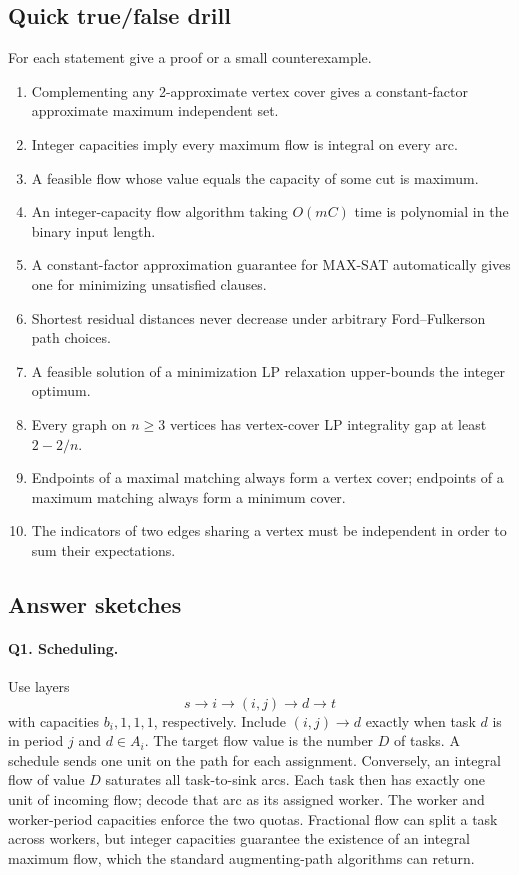 \documentclass[10pt]{article}
\theoremstyle{definition}
\begin{document}
\subsection{Quick true/false drill}
For each statement give a proof or a small counterexample.
\begin{enumerate}[label=\textbf{T\arabic*.}]
  \item Complementing any 2-approximate vertex cover gives a constant-factor
        approximate maximum independent set.
  \item Integer capacities imply every maximum flow is integral on every arc.
  \item A feasible flow whose value equals the capacity of some cut is maximum.
  \item An integer-capacity flow algorithm taking $O(mC)$ time is polynomial
        in the binary input length.
  \item A constant-factor approximation guarantee for MAX-SAT automatically
        gives one for minimizing unsatisfied clauses.
  \item Shortest residual distances never decrease under arbitrary
        Ford--Fulkerson path choices.
  \item A feasible solution of a minimization LP relaxation upper-bounds
        the integer optimum.
  \item Every graph on $n\ge3$ vertices has vertex-cover LP integrality gap
        at least $2-2/n$.
  \item Endpoints of a maximal matching always form a vertex cover;
        endpoints of a maximum matching always form a minimum cover.
  \item The indicators of two edges sharing a vertex must be independent
        in order to sum their expectations.
\end{enumerate}

\clearpage
\subsection{Answer sketches}
\paragraph{Q1. Scheduling.}
Use layers
\[
s\longrightarrow i\longrightarrow(i,j)\longrightarrow d\longrightarrow t
\]
with capacities $b_i,1,1,1$, respectively.  Include $(i,j)\to d$ exactly
when task $d$ is in period $j$ and $d\in A_i$.  The target flow value is
the number $D$ of tasks.  A schedule sends one unit on the path for each
assignment.  Conversely, an integral flow of value $D$ saturates all
task-to-sink arcs.  Each task then has exactly one unit of incoming flow;
decode that arc as its assigned worker.  The worker and worker-period
capacities enforce the two quotas.  Fractional flow can split a task across
workers, but integer capacities guarantee the existence of an integral
maximum flow, which the standard augmenting-path algorithms can return.
\end{document}
